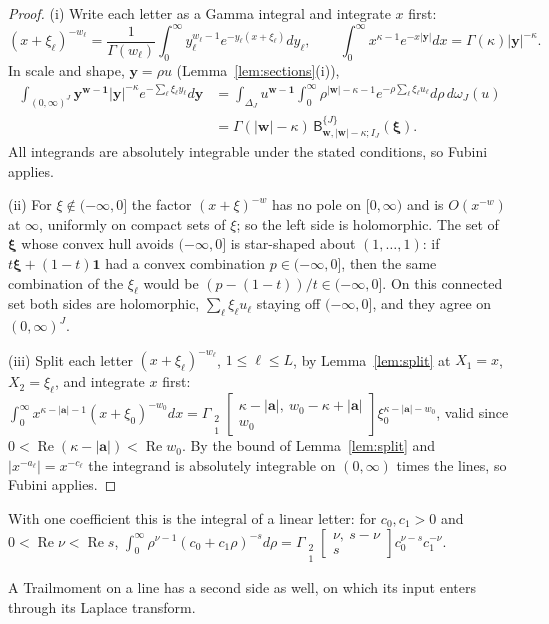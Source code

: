 \documentclass[11pt]{article}
\theoremstyle{plain}
\theoremstyle{definition}
\theoremstyle{remark}
\newcommand{\sB}{\mathsf B}
\newcommand{\Gst}[4]{\Gamma_{\substack{#1\\#2}}\!\begin{bmatrix}#3\\#4\end{bmatrix}}
\DeclareMathOperator{\re}{Re}
\begin{document}
\begin{proof}
(i) Write each letter as a Gamma integral and integrate $x$ first:
\[
(x+\xi_\ell)^{-w_\ell}=\frac1{\Gamma(w_\ell)}\int_0^\infty y_\ell^{w_\ell-1}e^{-y_\ell(x+\xi_\ell)}dy_\ell,\qquad \int_0^\infty x^{\kappa-1}e^{-x|\mathbf y|}dx=\Gamma(\kappa)|\mathbf y|^{-\kappa}.
\]
In scale and shape, $\mathbf y=\rho u$ (Lemma~\ref{lem:sections}(i)),
\begin{align*}
\int_{(0,\infty)^J}\mathbf y^{\mathbf w-\mathbf 1}|\mathbf y|^{-\kappa}e^{-\sum_\ell\xi_\ell y_\ell}d\mathbf y&=\int_{\Delta_J}u^{\mathbf w-\mathbf 1}\int_0^\infty\rho^{|\mathbf w|-\kappa-1}e^{-\rho\sum_\ell\xi_\ell u_\ell}d\rho\,d\omega_J(u)\\
&=\Gamma(|\mathbf w|-\kappa)\,\sB^{\{J\}}_{\mathbf w,|\mathbf w|-\kappa;I_J}(\boldsymbol\xi).
\end{align*}
All integrands are absolutely integrable under the stated conditions, so Fubini applies.

(ii) For $\xi\notin(-\infty,0]$ the factor $(x+\xi)^{-w}$ has no pole on $[0,\infty)$ and is $O(x^{-w})$ at $\infty$, uniformly on compact sets of $\xi$; so the left side is holomorphic. The set of $\boldsymbol\xi$ whose convex hull avoids $(-\infty,0]$ is star-shaped about $(1,\dots,1)$: if $t\boldsymbol\xi+(1-t)\mathbf 1$ had a convex combination $p\in(-\infty,0]$, then the same combination of the $\xi_\ell$ would be $(p-(1-t))/t\in(-\infty,0]$. On this connected set both sides are holomorphic, $\sum_\ell\xi_\ell u_\ell$ staying off $(-\infty,0]$, and they agree on $(0,\infty)^J$.

(iii) Split each letter $(x+\xi_\ell)^{-w_\ell}$, $1\le\ell\le L$, by Lemma~\ref{lem:split} at $X_1=x$, $X_2=\xi_\ell$, and integrate $x$ first: $\int_0^\infty x^{\kappa-|\mathbf a|-1}(x+\xi_0)^{-w_0}dx=\Gst21{\kappa-|\mathbf a|,\ w_0-\kappa+|\mathbf a|}{w_0}\xi_0^{\kappa-|\mathbf a|-w_0}$, valid since $0<\re(\kappa-|\mathbf a|)<\re w_0$. By the bound of Lemma~\ref{lem:split} and $|x^{-a_\ell}|=x^{-c_\ell}$ the integrand is absolutely integrable on $(0,\infty)$ times the lines, so Fubini applies.
\end{proof}

With one coefficient this is the integral of a linear letter: for $c_0,c_1>0$ and $0<\re\nu<\re s$, $\int_0^\infty\rho^{\nu-1}(c_0+c_1\rho)^{-s}d\rho=\Gst21{\nu,\ s-\nu}{s}c_0^{\nu-s}c_1^{-\nu}$.

A Trailmoment on a line has a second side as well, on which its input enters through its Laplace transform.
\end{document}

